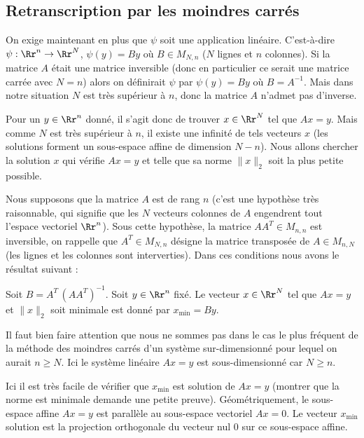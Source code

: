 \documentclass[11pt,class=report,crop=false]{standalone}
\begin{document}
\subsection{Retranscription par les moindres carrés}

On exige maintenant en plus que $\psi$ soit une application linéaire.
C'est-à-dire $\psi : \Rr^n \to \Rr^N$, $\psi(y) = By$ où $B \in M_{N,n}$ ($N$ lignes et $n$ colonnes).
Si la matrice $A$ était une matrice inversible (donc en particulier ce serait une matrice carrée avec $N=n$) alors on définirait $\psi$ par $\psi(y) = B y$ où $B = A^{-1}$.
Mais dans notre situation $N$ est très supérieur à $n$, donc la matrice $A$ n'admet pas d'inverse.

Pour un $y \in \Rr^n$ donné, il s'agit donc de trouver $x \in \Rr^N$ tel que $Ax = y$. Mais comme $N$ est très supérieur à $n$, il existe une infinité de tels vecteurs $x$ (les solutions forment un sous-espace affine de dimension $N-n$). Nous allons chercher la solution $x$ qui vérifie $Ax=y$ et telle que sa norme $\| x \|_2$ soit la plus petite possible. 

Nous supposons que la matrice $A$ est de rang $n$ (c'est une hypothèse très raisonnable, qui signifie que les $N$ vecteurs colonnes de $A$ engendrent tout l'espace vectoriel $\Rr^n$). Sous cette hypothèse, la matrice $A A^T \in M_{n,n}$ est inversible, on rappelle que $A^T \in M_{N,n} $ désigne la matrice transposée de $A \in M_{n,N}$ (les lignes et les colonnes sont interverties).
Dans ces conditions nous avons le résultat suivant :
\begin{proposition}
	 Soit $ B = A^T \, (A A^T) ^{-1}$.
	 Soit $y \in \Rr^n$ fixé.
	 Le vecteur $x \in \Rr^N$ tel que $Ax=y$ et $\| x \|_ 2$ soit minimale est donné par $x_{\min} = By$.
\end{proposition}

Il faut bien faire attention que nous ne sommes pas dans le cas le plus fréquent de la méthode des moindres carrés d'un système sur-dimensionné pour lequel on aurait $n \ge N$. Ici le système linéaire $Ax=y$ est sous-dimensionné car $N \ge n$.

Ici il est très facile de vérifier que $x_{\min}$ est solution de $Ax=y$ (montrer que la norme est minimale demande une petite preuve).
Géométriquement, le sous-espace affine $Ax=y$ est parallèle au sous-espace vectoriel $Ax=0$. Le vecteur $x_{\min}$ solution est la projection orthogonale du vecteur nul $0$ sur ce sous-espace affine.
\end{document}

